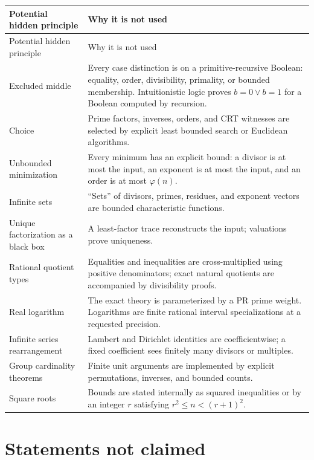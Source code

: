 \documentclass[11pt]{article}
\theoremstyle{definition}
\begin{document}
\begin{longtable}{@{}p{}p{}@{}}
\toprule
Potential hidden principle & Why it is not used \\
\midrule
\endfirsthead
\toprule Potential hidden principle & Why it is not used \\
\midrule
\endhead
Excluded middle & Every case distinction is on a primitive-recursive Boolean: equality, order, divisibility, primality, or bounded membership. Intuitionistic logic proves \(b=0\vee b=1\) for a Boolean computed by recursion.\\
Choice & Prime factors, inverses, orders, and CRT witnesses are selected by explicit least bounded search or Euclidean algorithms.\\
Unbounded minimization & Every minimum has an explicit bound: a divisor is at most the input, an exponent is at most the input, and an order is at most \(\varphi(n)\).\\
Infinite sets & ``Sets'' of divisors, primes, residues, and exponent vectors are bounded characteristic functions.\\
Unique factorization as a black box & A least-factor trace reconstructs the input; valuations prove uniqueness.\\
Rational quotient types & Equalities and inequalities are cross-multiplied using positive denominators; exact natural quotients are accompanied by divisibility proofs.\\
Real logarithm & The exact theory is parameterized by a PR prime weight. Logarithms are finite rational interval specializations at a requested precision.\\
Infinite series rearrangement & Lambert and Dirichlet identities are coefficientwise; a fixed coefficient sees finitely many divisors or multiples.\\
Group cardinality theorems & Finite unit arguments are implemented by explicit permutations, inverses, and bounded counts.\\
Square roots & Bounds are stated internally as squared inequalities or by an integer \(r\) satisfying \(r^2\le n<(r+1)^2\).\\
\bottomrule
\end{longtable}

\section{Statements not claimed}
\end{document}
